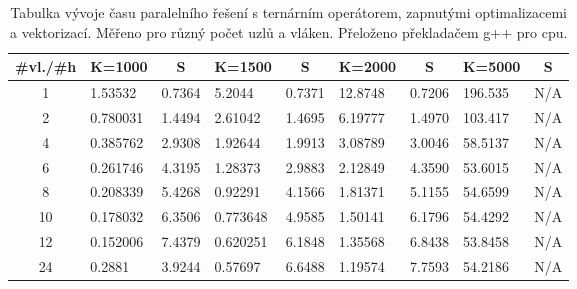 \documentclass[a4paper,11pt]{article}
\begin{document}
  
  \begin{table}[ht]
  \begin{center}
   \begin{tabular}{|c|l|c|l|c|l|c|l|c|}
    \hline 
    \#vl./\#h & K=1000 & S & K=1500 & S & K=2000 & S & K=5000 & S \\
   \hline 
   \hline 
   1 & 1.53532 & 0.7364 & 5.2044 & 0.7371 & 12.8748 & 0.7206 & 196.535 & N/A\\
   \hline
    2 & 0.780031 & 1.4494 & 2.61042 & 1.4695 & 6.19777 & 1.4970 & 103.417 & N/A\\
   \hline
    4 & 0.385762 & 2.9308 & 1.92644 & 1.9913 & 3.08789 & 3.0046 & 58.5137 & N/A\\
   \hline
    6 & 0.261746 & 4.3195 & 1.28373 & 2.9883 & 2.12849 & 4.3590 & 53.6015 & N/A\\
   \hline
    8 & 0.208339 & 5.4268 & 0.92291 & 4.1566 & 1.81371 & 5.1155 & 54.6599 & N/A\\
      \hline
    10 & 0.178032 & 6.3506 & 0.773648 & 4.9585 & 1.50141 & 6.1796 & 54.4292 & N/A\\ 
      \hline
    12 & 0.152006 & 7.4379 & 0.620251 & 6.1848 & 1.35568 & 6.8438 & 53.8458 & N/A\\
      \hline
    24 & 0.2881 & 3.9244 & 0.57697 & 6.6488 & 1.19574 & 7.7593 & 54.2186 & N/A\\
   \hline    
    \end{tabular}
   \caption{Tabulka vývoje času paralelního řešení s ternárním operátorem, zapnutými optimalizacemi a vektorizací. Měřeno pro různý počet uzlů a vláken. Přeloženo 
   překladačem g++ pro cpu.} 
   \label{tab.tab17}
  \end{center}   
  \end{table}
\end{document}
